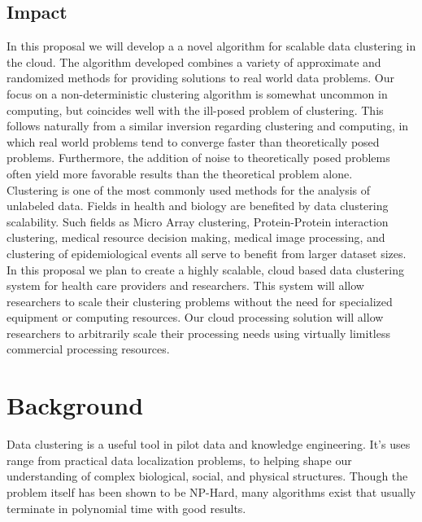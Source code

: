 \documentclass[a4paper,10pt]{article}
\begin{document}
\subsection{Impact}

In this proposal we will develop a a novel algorithm for scalable data clustering in
the cloud. The algorithm developed combines a variety of approximate and
randomized methods for providing solutions to real world data problems. Our
focus on a non-deterministic clustering algorithm is somewhat uncommon in
computing, but coincides well with the ill-posed problem of clustering. This
follows naturally from a similar inversion regarding clustering and computing,
in which real world problems tend to converge faster than theoretically posed
problems. Furthermore, the addition of noise to theoretically posed problems
often yield more favorable results than the theoretical problem alone.\\ 

Clustering is one of the most commonly used methods for the analysis of 
unlabeled data.  Fields
in health and biology are benefited by data clustering scalability. Such fields
as Micro Array clustering, Protein-Protein interaction clustering, medical 
resource decision making, medical image processing,  and clustering of
epidemiological events all serve to benefit from larger dataset sizes.\\
In this proposal we plan to create a highly scalable, cloud based data 
clustering
system for health care providers and researchers.  This system will allow
researchers to scale their clustering problems without the need for  specialized
equipment or computing resources. Our cloud processing solution will allow
researchers to arbitrarily scale their processing needs using virtually
limitless commercial processing resources. \\ 

\section{Background}
Data clustering is a useful tool in pilot data and knowledge engineering. It's uses range from practical data localization problems,
to helping shape our understanding of complex biological, social, and physical structures. Though the problem itself
has been shown to be NP-Hard\cite{dasgupta08}\cite{Mahajan09}, many algorithms exist that usually terminate in polynomial 
time with good results.
\end{document}

